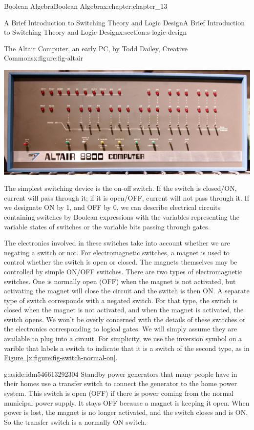 \documentclass[oneside,10pt,]{book}
\newcommand{\xreffont}{\relax}
\numberwithin{equation}{section}
\begin{document}
\begin{chapterptx}{Boolean Algebra}{}{Boolean Algebra}{}{}{x:chapter:chapter_13}
\begin{sectionptx}{A Brief Introduction to Switching Theory and Logic Design}{}{A Brief Introduction to Switching Theory and Logic Design}{}{}{x:section:s-logic-design}
\begin{figureptx}{The Altair Computer, an early PC, by Todd Dailey, Creative Commons}{x:figure:fig-altair}{}%
\begin{image}{0.1}{0.8}{0.1}%
\includegraphics[width=\linewidth]{images/fig-altair.jpg}
\end{image}%
\tcblower
\end{figureptx}%
The simplest switching device is the on-off switch. If the switch is closed\slash{}ON, current will pass through it; if it is open\slash{}OFF, current will not pass through it. If we designate ON by 1, and OFF by 0, we can describe electrical circuits containing switches by Boolean expressions with the variables representing the variable states of switches or the variable bits passing through gates.%
\par
The electronics involved in these switches take into account whether we are negating a switch or not.  For electromagnetic switches, a magnet is used to control whether the switch is open or closed. The magnets themselves may be controlled by simple ON\slash{}OFF switches.   There are two types of electromagnetic switches.  One is normally open (OFF) when the magnet is not activated, but activating the magnet  will close the circuit and the switch is then ON.  A separate type of switch corresponds with a negated switch. For that type, the switch is closed when the magnet is not activated, and when the magnet is activated, the switch opens.  We won't be overly concerned with the details of these switches or the electronics corresponding to logical gates.  We will simply assume they are available to plug into a circuit.    For simplicity, we use the inversion symbol on a varible that labels a switch to indicate that it is a switch of the second type, as in \hyperref[x:figure:fig-switch-normal-on]{Figure~{\xreffont\ref{x:figure:fig-switch-normal-on}}}.%
\begin{aside}{}{g:aside:idm546613292304}%
Standby power generators that many people have in their homes use a transfer switch to connect the generator to the home power system.  This switch is open (OFF) if there is power coming from the normal municipal power supply. It stays OFF because a magnet is keeping it open.  When power is lost, the magnet is no longer activated, and the switch closes and is ON. So the transfer switch is a normally ON switch.%

\end{aside}
\end{sectionptx}
\end{chapterptx}
\end{document}
